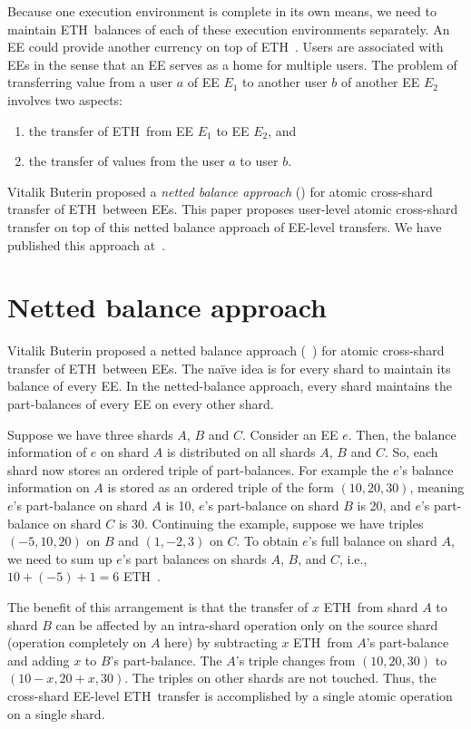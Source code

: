 \documentclass{article}
\newcommand{\eth}[0]{ETH~}
\begin{document}
Because one execution environment is complete in its own means, we need to maintain \eth balances of each of these execution environments separately. An EE could provide another currency on top of \eth. Users are associated with EEs in the sense that an EE serves as a home for multiple users. The problem of transferring value from a user $a$ of EE $E_1$ to another user $b$ of another EE $E_2$ involves two aspects:
\begin{enumerate}
    \item the transfer of \eth from EE $E_1$ to EE $E_2$, and
    \item the transfer of values from the user $a$ to user $b$.
\end{enumerate}

Vitalik Buterin proposed a {\em netted balance approach} (\cite{netted-balance}) for atomic cross-shard transfer of \eth between EEs. This paper proposes user-level atomic cross-shard transfer on top of this netted balance approach of EE-level transfers. We have published this approach at~\cite{ethres-raghavendra}.

\section{Netted balance approach}
\label{sec:netted-balance}
Vitalik Buterin proposed a netted balance approach (~\cite{netted-balance}) for atomic cross-shard transfer of \eth between EEs. The naïve idea is for every shard to maintain its balance of every EE. In the netted-balance approach, every shard maintains the part-balances of every EE on every other shard. 

Suppose we have three shards $A$, $B$ and $C$. Consider an EE $e$. Then, the balance information of $e$ on shard $A$ is distributed on all shards $A$, $B$ and $C$. So, each shard now stores an ordered triple of part-balances. For example the $e$'s balance information on $A$ is stored as an ordered triple of the form $(10, 20, 30)$, meaning $e$'s part-balance on shard $A$ is 10, $e$'s part-balance on shard $B$ is 20, and $e$'s part-balance on shard $C$ is 30. Continuing the example, suppose we have triples $(-5, 10, 20)$ on $B$ and $(1,-2,3)$ on $C$. To obtain $e$'s full balance on shard $A$, we need to sum up $e$'s part balances on shards $A$, $B$, and $C$, i.e., $10 + (-5) + 1 = 6$ \eth. 

The benefit of this arrangement is that the transfer of $x$ \eth from shard $A$ to shard $B$ can be affected by an intra-shard operation only on the source shard (operation completely on $A$ here) by subtracting $x$ \eth from $A$'s part-balance and adding $x$ to $B$'s part-balance. The $A$'s triple changes from $(10, 20, 30)$ to $(10-x, 20+x, 30)$. The triples on other shards are not touched. Thus, the cross-shard EE-level \eth transfer is accomplished by a single atomic operation on a single shard.
\end{document}
